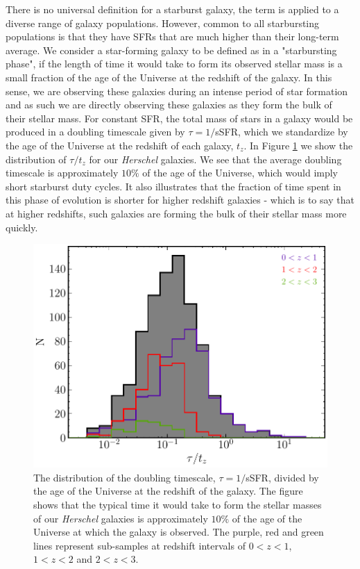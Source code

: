 There is no universal definition for a starburst galaxy, the term is applied to a diverse range of galaxy populations. However, common to all starbursting populations is that they have SFRs that are much higher than their long-term average. We consider a star-forming galaxy to be defined as in a "starbursting phase", if the length of time it would take to form its observed stellar mass is a small fraction of the age of the Universe at the redshift of the galaxy. In this sense, we are observing these galaxies during an intense period of star formation and as such we are directly observing these galaxies as they form the bulk of their stellar mass. For constant SFR, the total mass of stars in a galaxy would be produced in a doubling timescale given by $\tau = 1/$sSFR, which we standardize by the age of the Universe at the redshift of each galaxy, $t_z$. In Figure \ref{fig:tau_against_age} we show the distribution of $\tau/t_z$ for our \textit{Herschel} galaxies. We see that the average doubling timescale is approximately $10\%$ of the age of the Universe, which would imply short starburst duty cycles. It also illustrates that the fraction of time spent in this phase of evolution is shorter for higher redshift galaxies - which is to say that at higher redshifts, such galaxies are forming the bulk of their stellar mass more quickly.

\begin{figure}
	\centering
	\includegraphics[width=0.8\columnwidth]{Figures/tau_against_age.pdf}
	\caption[Doubling timescale of \textit{Herschel} galaxies]{The distribution of the doubling timescale, $\tau = 1/$sSFR, divided by the age of the Universe at the redshift of the galaxy. The figure shows that the typical time it would take to form the stellar masses of our \textit{Herschel} galaxies is approximately $10\%$ of the age of the Universe at which the galaxy is observed. The purple, red and green lines represent sub-samples at redshift intervals of $0 < z < 1$, $1 < z < 2$ and $2 < z < 3$.}
	\label{fig:tau_against_age}
\end{figure}

